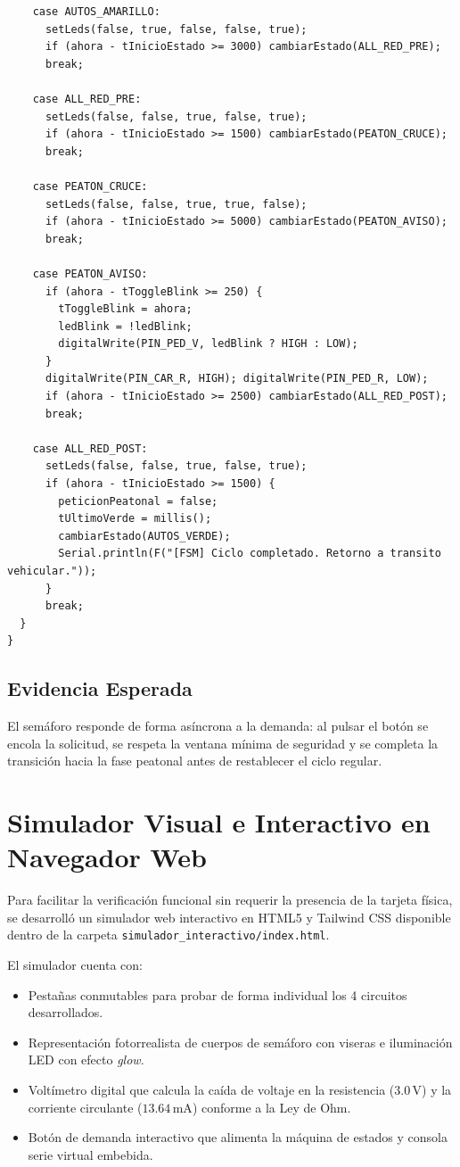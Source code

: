 \documentclass[12pt,a4paper]{article}
\begin{document}
\begin{lstlisting}
    case AUTOS_AMARILLO:
      setLeds(false, true, false, false, true);
      if (ahora - tInicioEstado >= 3000) cambiarEstado(ALL_RED_PRE);
      break;

    case ALL_RED_PRE:
      setLeds(false, false, true, false, true);
      if (ahora - tInicioEstado >= 1500) cambiarEstado(PEATON_CRUCE);
      break;

    case PEATON_CRUCE:
      setLeds(false, false, true, true, false);
      if (ahora - tInicioEstado >= 5000) cambiarEstado(PEATON_AVISO);
      break;

    case PEATON_AVISO:
      if (ahora - tToggleBlink >= 250) {
        tToggleBlink = ahora;
        ledBlink = !ledBlink;
        digitalWrite(PIN_PED_V, ledBlink ? HIGH : LOW);
      }
      digitalWrite(PIN_CAR_R, HIGH); digitalWrite(PIN_PED_R, LOW);
      if (ahora - tInicioEstado >= 2500) cambiarEstado(ALL_RED_POST);
      break;

    case ALL_RED_POST:
      setLeds(false, false, true, false, true);
      if (ahora - tInicioEstado >= 1500) {
        peticionPeatonal = false;
        tUltimoVerde = millis();
        cambiarEstado(AUTOS_VERDE);
        Serial.println(F("[FSM] Ciclo completado. Retorno a transito vehicular."));
      }
      break;
  }
}
\end{lstlisting}

\subsection{Evidencia Esperada}
El semáforo responde de forma asíncrona a la demanda: al pulsar el botón se encola la solicitud, se respeta la ventana mínima de seguridad y se completa la transición hacia la fase peatonal antes de restablecer el ciclo regular.

\section{Simulador Visual e Interactivo en Navegador Web}
Para facilitar la verificación funcional sin requerir la presencia de la tarjeta física, se desarrolló un simulador web interactivo en HTML5 y Tailwind CSS disponible dentro de la carpeta \texttt{simulador\_interactivo/index.html}. 

El simulador cuenta con:
\begin{itemize}[noitemsep]
    \item Pestañas conmutables para probar de forma individual los 4 circuitos desarrollados.
    \item Representación fotorrealista de cuerpos de semáforo con viseras e iluminación LED con efecto \textit{glow}.
    \item Voltímetro digital que calcula la caída de voltaje en la resistencia ($3.0\,\text{V}$) y la corriente circulante ($13.64\,\text{mA}$) conforme a la Ley de Ohm.
    \item Botón de demanda interactivo que alimenta la máquina de estados y consola serie virtual embebida.
\end{itemize}
\end{document}
